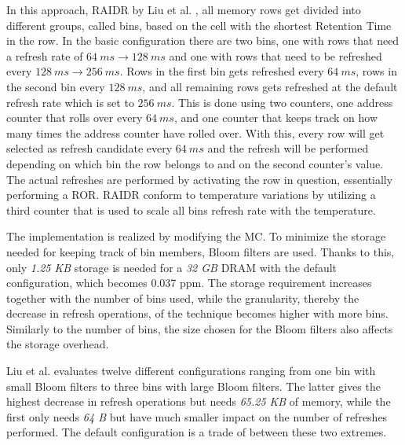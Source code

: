 In this approach, RAIDR by Liu et al. \cite{raidr}, all memory rows get divided into different groups, called bins, based on the cell with the shortest Retention Time in the row. In the basic configuration there are two bins, one with rows that need a refresh rate of $64\:ms \to 128\:ms$ and one with rows that need to be refreshed every $128\:ms \to 256\:ms$. Rows in the first bin gets refreshed every $64\:ms$, rows in the second bin every $128\:ms$, and all remaining rows gets refreshed at the default refresh rate which is set to $256\:ms$. This is done using two counters, one address counter that rolls over every $64\:ms$, and one counter that keeps track on how many times the address counter have rolled over. With this, every row will get selected as refresh candidate every $64\:ms$ and the refresh will be performed depending on which bin the row belongs to and on the second counter's value. The actual refreshes are performed by activating the row in question, essentially performing a ROR. RAIDR conform to temperature variations by utilizing a third counter that is used to scale all bins refresh rate with the temperature.

The implementation is realized by modifying the MC. To minimize the storage needed for keeping track of bin members, Bloom filters are used. Thanks to this, only \textit{1.25 KB} storage is needed for a \textit{32 GB} DRAM with the default configuration, which becomes 0.037 ppm. The storage requirement increases together with the number of bins used, while the granularity, thereby the decrease in refresh operations, of the technique becomes higher with more bins. Similarly to the number of bins, the size chosen for the Bloom filters also affects the storage overhead. 

Liu et al. evaluates twelve different configurations ranging from one bin with small Bloom filters to three bins with large Bloom filters. The latter gives the highest decrease in refresh operations but needs \textit{65.25 KB} of memory, while the first only needs \textit{64 B} but have much smaller impact on the number of refreshes performed. The default configuration is a trade of between these two extremes. 